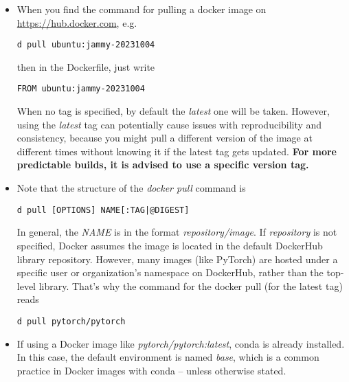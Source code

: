 \documentclass[12pt, a4paper]{scrbook}
\numberwithin{equation}{section}
\theoremstyle{definition}
\theoremstyle{definition}
\begin{document}
	\begin{itemize}
		\item When you find the command for pulling a docker image on \url{https://hub.docker.com}, e.g.~
		
		\begin{lstlisting}[style=mystylebash, label=alg:dockerhub, xleftmargin=\parindent]
			d pull ubuntu:jammy-20231004
		\end{lstlisting}
		
		then in the Dockerfile, just write 
		
		\begin{lstlisting}[style=mystylebash, label=alg:dockerfile_from, xleftmargin=\parindent]
			FROM ubuntu:jammy-20231004
		\end{lstlisting}
		
		When no tag is specified, by default the \textit{latest} one will be taken. However, using the \textit{latest} tag can potentially cause issues with reproducibility and consistency, because you might pull a different version of the image at different times without knowing it if the latest tag gets updated. \textbf{For more predictable builds, it is advised to use a specific version tag.}
		
		\item Note that the structure of the \textit{docker pull} command is
		
		\begin{lstlisting}[style=mystylebash, label=alg:docker_pull, xleftmargin=\parindent]
			d pull [OPTIONS] NAME[:TAG|@DIGEST]
		\end{lstlisting}
		
		In general, the \textit{NAME} is in the format \textit{repository/image}. If \textit{repository} is not specified, Docker assumes the image is located in the default DockerHub library repository. However, many images (like PyTorch) are hosted under a specific user or organization's namespace on DockerHub, rather than the top-level library. That's why the command for the docker pull (for the latest tag) reads 
		
		\begin{lstlisting}[style=mystylebash, label=alg:docker_pull_exmp, xleftmargin=\parindent]
			d pull pytorch/pytorch
		\end{lstlisting}
		
		\item If using a Docker image like \textit{pytorch/pytorch:latest}, conda is already installed. In this case, the default environment is named \textit{base}, which is a common practice in Docker images with conda -- unless otherwise stated. 
		

\end{itemize}
\end{document}
